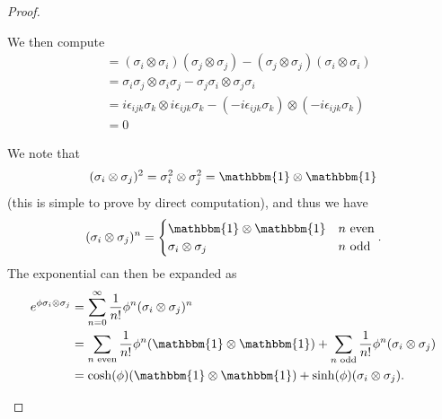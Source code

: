 \begin{proof}
\begin{parts}
	We then compute
	\begin{align*}
		[\sigma_i\otimes \sigma_i, \sigma_j\otimes \sigma_j] &= (\sigma_i\otimes \sigma_i)(\sigma_j\otimes \sigma_j) - (\sigma_j\otimes \sigma_j)(\sigma_i\otimes \sigma_i) \\
		&=\sigma_i\sigma_j \otimes \sigma_i\sigma_j -\sigma_j\sigma_i \otimes \sigma_j\sigma_i  \\
		&= i\epsilon_{ijk}\sigma_k \otimes i\epsilon_{ijk}\sigma_k - (-i\epsilon_{ijk}\sigma_k) \otimes (-i\epsilon_{ijk}\sigma_k) \\
		&= 0 
	\end{align*}
\item We note that
	\[
		(\sigma_i\otimes \sigma_j)^2 = \sigma_i^2 \otimes \sigma_j^2 = \mathbbm{1}\otimes \mathbbm{1}
	\]
	(this is simple to prove by direct computation), and thus we have
	\[
		(\sigma_i\otimes \sigma_j)^n = \begin{cases}
			\mathbbm{1} \otimes \mathbbm{1} & n\text{ even}\\
			\sigma_i\otimes\sigma_j & n\text{ odd}
		\end{cases}
	.\] 
	The exponential can then be expanded as
	\begin{align*}
		e^{\phi \sigma_i\otimes \sigma_j} &= \sum_{n=0}^{\infty} \frac{1}{n!}\phi^n (\sigma_i\otimes\sigma_j)^n \\
						  &= \sum_{n\text{ even}} \frac{1}{n!}\phi^n (\mathbbm{1}\otimes \mathbbm{1}) + \sum_{n\text{ odd}} \frac{1}{n!}\phi^n (\sigma_i\otimes\sigma_j) \\
						  &= \cosh(\phi)(\mathbbm{1}\otimes\mathbbm{1}) + \sinh(\phi)(\sigma_i\otimes\sigma_j).\qedhere 
	\end{align*}
	\end{parts}
\end{proof}
